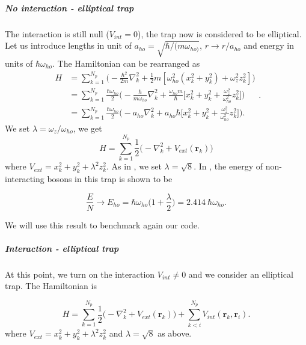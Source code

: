 \subparagraph{No interaction - elliptical trap}
The interaction is still null ($V_{int}=0$), the trap now is considered to be elliptical.\\
Let us introduce lengths in unit of $a_{ho}=\sqrt{\hbar/(m\omega_{ho)}}$, $r\rightarrow r/a_{ho}$ and energy in units of $\hbar\omega_{ho}$. The Hamiltonian can be rearranged as 
\begin{equation*}
\begin{split}
H&=\sum_{k=1}^{N_p}\bigg(-\frac{\hbar^2}{2m}\nabla^2_{k}+\frac{1}{2}m[\omega^{2}_{ho}(x^2_k+y^2_k)+\omega^{2}_{z}z_k^2]\bigg)\\
&=\sum_{k=1}^{N_p}\frac{\hbar \omega_{ho}}{2}\bigg(-\frac{\hbar}{m\omega_{ho}}\nabla^2_{k}+\frac{\omega_{ho}m}{\hbar}\bigg[x^2_k+y^2_k+\frac{\omega^{2}_{z}}{\omega^{2}_{ho}}z^2_k\bigg]\bigg)\\
&=\sum_{k=1}^{N_p}\frac{\hbar \omega_{ho}}{2}\bigg(-a_{ho}\nabla^2_{k}+a_{ho}{\hbar}\bigg[x^2_k+y^2_k+\frac{\omega^{2}_{z}}{\omega^{2}_{ho}}z^2_k\bigg]\bigg).
\end{split}.
\end{equation*}
We set $\lambda=\omega_z/\omega_{ho}$, we get
\begin{equation}
\label{ham}
H=\sum_{k=1}^{N_p}\frac{1}{2}\bigg(-\nabla^2_{k}+V_{ext}(\mathbf{r}_k)\bigg)
\end{equation}
where $V_{ext}=x^2_k+y^2_k+\lambda^2 z^2_k$. As in \cite{DalfString}, we set $\lambda=\sqrt{8}$. In \cite{vmcarticle}, the energy of non-interacting bosons in this trap is shown to be

\begin{equation*}
	\frac{E}{N}\rightarrow E_{ho}=\hbar\omega_{ho}\bigg(1+\frac{\lambda}{2}\bigg)=2.414\ \hbar\omega_{ho}.
\end{equation*}

We will use this result to benchmark again our code.

\subparagraph{Interaction - elliptical trap}
At this point, we turn on the interaction $V_{int}\neq 0$ and we consider an elliptical trap. The Hamiltonian is

\begin{equation}
\label{ham2}
H=\sum_{k=1}^{N_p}\frac{1}{2}\bigg(-\nabla^2_{k}+V_{ext}(\mathbf{r}_k)\bigg)+\sum_{k<i}^{N_p} V_{int}(\mathbf{r}_k,\mathbf{r}_i).
\end{equation}
where $V_{ext}=x^2_k+y^2_k+\lambda^2 z^2_k$ and $\lambda=\sqrt{8}$ as above.

